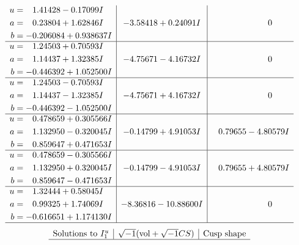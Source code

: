 \documentclass[1p]{elsarticle_modified}
\theoremstyle{definition}
\newcommand{\I}{\sqrt{-1}}
\begin{document}
$$\begin{array}{c|c|c}
\begin{aligned}
u &= \phantom{-}1.41428 - 0.17099 I \\
a &= \phantom{-}0.23804 + 1.62846 I \\
b &= -0.206084 + 0.938637 I\end{aligned}
 & -3.58418 + 0.24091 I & \phantom{-0.000000 } 0 \\ \hline\begin{aligned}
u &= \phantom{-}1.24503 + 0.70593 I \\
a &= \phantom{-}1.14437 + 1.32385 I \\
b &= -0.446392 + 1.052500 I\end{aligned}
 & -4.75671 - 4.16732 I & \phantom{-0.000000 } 0 \\ \hline\begin{aligned}
u &= \phantom{-}1.24503 - 0.70593 I \\
a &= \phantom{-}1.14437 - 1.32385 I \\
b &= -0.446392 - 1.052500 I\end{aligned}
 & -4.75671 + 4.16732 I & \phantom{-0.000000 } 0 \\ \hline\begin{aligned}
u &= \phantom{-}0.478659 + 0.305566 I \\
a &= \phantom{-}1.132950 - 0.320045 I \\
b &= \phantom{-}0.859647 + 0.471653 I\end{aligned}
 & -0.14799 + 4.91053 I & \phantom{-}0.79655 - 4.80579 I \\ \hline\begin{aligned}
u &= \phantom{-}0.478659 - 0.305566 I \\
a &= \phantom{-}1.132950 + 0.320045 I \\
b &= \phantom{-}0.859647 - 0.471653 I\end{aligned}
 & -0.14799 - 4.91053 I & \phantom{-}0.79655 + 4.80579 I \\ \hline\begin{aligned}
u &= \phantom{-}1.32444 + 0.58045 I \\
a &= \phantom{-}0.99325 + 1.74069 I \\
b &= -0.616651 + 1.174130 I\end{aligned}
 & -8.36816 - 10.88600 I & \phantom{-0.000000 } 0\\
 \hline 
 \end{array}$$\newpage$$\begin{array}{c|c|c}  
\text{Solutions to }I^u_{1}& \I (\text{vol} + \sqrt{-1}CS) & \text{Cusp shape}\\
 \hline 

\end{array}$$
\end{document}
